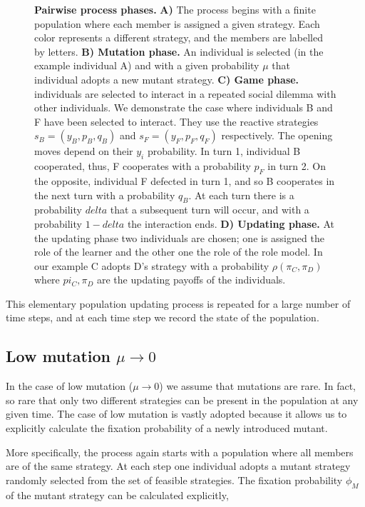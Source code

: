 \documentclass[11pt]{article}
\theoremstyle{plainCl1}
\theoremstyle{plainCl2}
\begin{document}
\begin{figure}[!htbp]
    \centering
    
    \caption{\textbf{Pairwise process phases.} \textbf{A)} The process begins
    with a finite population where each member is assigned a given strategy.
    Each color represents a different strategy, and the members are labelled by
    letters. \textbf{B) Mutation phase.} An individual is selected (in the
    example individual A) and with a given probability \(\mu\) that individual
    adopts a new mutant strategy. \textbf{C) Game phase.} individuals are
    selected to interact in a repeated social dilemma with other individuals. We
    demonstrate the case where individuals B and F have been selected to
    interact. They use the reactive strategies \(s_{B} = (y_B, p_B, q_B)\) and
    \(s_{F} = (y_F, p_F, q_F)\) respectively. The opening moves depend on their
    \(y_i\) probability. In turn 1, individual B cooperated,
    thus, F cooperates with a probability \(p_{F}\) in turn 2. On the opposite,
    individual F defected in turn 1, and so B cooperates in the next turn with
    a probability \(q_{B}\). At each turn there is a probability \(delta\) that a
    subsequent turn will occur, and with a probability \(1- delta\) the interaction ends.
    \textbf{D) Updating phase.} At the updating phase two individuals are chosen;
    one is assigned the role of the learner and the other one the role
    of the role model. In our example C adopts D's strategy with a probability
    \(\rho(\pi_{C}, \pi_{D})\) where \(pi_{C}, \pi_{D}\) are the updating
    payoffs of the individuals.}\label{fig:pairwise_phases}
\end{figure}

This elementary population updating process is repeated for a large number of
time steps, and at each time step we record the state of the population.

\subsection{Low mutation \(\mu \rightarrow 0\)}

In the case of low mutation (\(\mu \rightarrow 0\)) we assume that mutations are
rare. In fact, so rare that only two different strategies can be present in the
population at any given time. The case of low mutation is vastly adopted because
it allows us to explicitly calculate the fixation probability of a newly
introduced mutant.

More specifically, the process again starts with a population where all members are of the same
strategy. At each step one individual adopts a mutant strategy randomly selected
from the set of feasible strategies. The fixation probability \(\phi_{M}\) of the
mutant strategy can be calculated explicitly,
\end{document}

